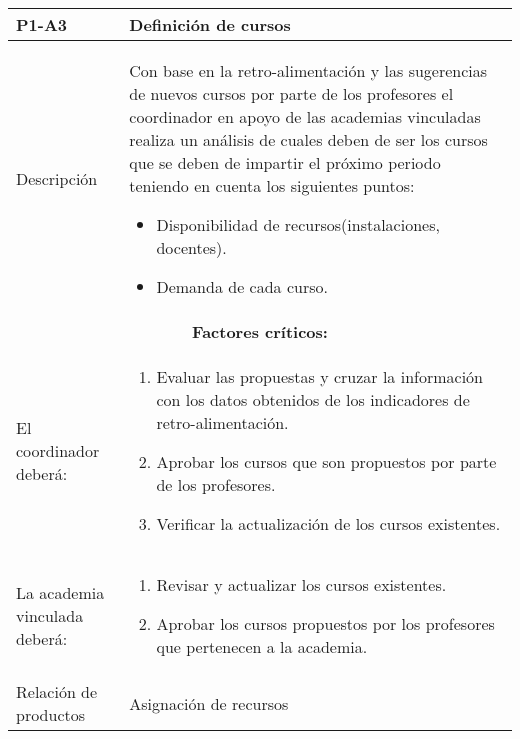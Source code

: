 \begin{table}[H]
	\centering
	\begin{tabular}{p{3.5cm} p{12.5cm}}
		\hline
		\rowcolor{LightBlue2} \textbf{P1-A3} & \textbf{Definición de cursos}\\
		\hline\hline
		Descripción & Con base en la retro-alimentación y las sugerencias de nuevos cursos por parte de los profesores el coordinador en apoyo de las academias vinculadas realiza un análisis de cuales deben de ser los cursos que se deben de impartir el próximo periodo teniendo en cuenta los siguientes puntos:
		\begin{itemize}
			\item Disponibilidad de recursos(instalaciones, docentes).
			\item Demanda de cada curso.
		\end{itemize}\\
		 \hline\hline		
			\multicolumn{2}{|c|}{\textbf{Factores críticos:}}\\
		\hline\hline
			{El coordinador deberá:}&
			\begin{enumerate}
				\item Evaluar las propuestas y cruzar la información con los datos obtenidos de los indicadores de retro-alimentación. 
				\item Aprobar los cursos que son propuestos por parte de los profesores.
				\item Verificar la actualización de los cursos existentes.
			\end{enumerate}\\
			{La academia vinculada deberá:}&
			\begin{enumerate}
				\item Revisar y actualizar los cursos existentes.
				\item Aprobar los cursos propuestos por los profesores que pertenecen a la academia.
			\end{enumerate}\\
		\hline
		Relación de productos & Asignación de recursos\\
		\hline
	\end{tabular}
\end{table}

